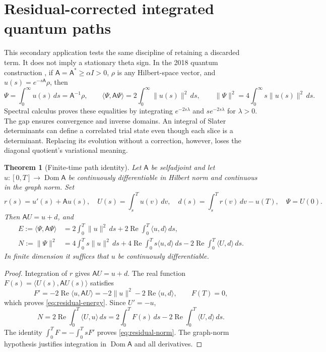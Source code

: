 \documentclass[11pt]{article}
\numberwithin{equation}{section}
\newtheorem{theorem}{Theorem}[section]
\theoremstyle{definition}
\theoremstyle{remark}
\begin{document}
\section{Residual-corrected integrated quantum paths}
\label{sec:quantum-paths}
This secondary application tests the same discipline of retaining a
discarded term.  It does not imply a stationary theta sign.  In the
2018 quantum construction \cite{baker2018heat}, if
$\mathsf A=\mathsf A^*\ge\alpha I>0$, $\rho$ is any Hilbert-space
vector, and $u(s)=e^{-s\mathsf A}\rho$, then
\begin{equation}\label{eq:infinite-quantum-identities}
 \Psi=\int_0^\infty u(s)\,ds=\mathsf A^{-1}\rho,\qquad
 \langle\Psi,\mathsf A\Psi\rangle
 =2\int_0^\infty\|u(s)\|^2\,ds,\qquad
 \|\Psi\|^2=4\int_0^\infty s\|u(s)\|^2\,ds.
\end{equation}
Spectral calculus proves these equalities by integrating
$e^{-2s\lambda}$ and $s e^{-2s\lambda}$ for $\lambda>0$.
The gap ensures convergence and inverse domains.  An integral of
Slater determinants can define a correlated trial state even though
each slice is a determinant.  Replacing its evolution without a
correction, however, loses the diagonal quotient's variational meaning.

\begin{theorem}[Finite-time path identity]\label{thm:residual-path}
Let $\mathsf A$ be selfadjoint and let $u:[0,T]\to\operatorname{Dom}
\mathsf A$ be continuously differentiable in Hilbert norm and
continuous in the graph norm.  Set
\begin{equation}\label{eq:path-defects}
 r(s)=u'(s)+\mathsf A u(s),\quad
 U(s)=\int_s^T u(v)\,dv,\quad
 d(s)=\int_s^T r(v)\,dv-u(T),\quad \Psi=U(0).
\end{equation}
Then $\mathsf A U=u+d$, and
\begin{align}
 E:=\langle\Psi,\mathsf A\Psi\rangle
 &=2\int_0^T\|u\|^2\,ds
   +2\operatorname{Re}\int_0^T\langle u,d\rangle\,ds,
   \label{eq:residual-energy}\\
 N:=\|\Psi\|^2
 &=4\int_0^T s\|u\|^2\,ds
   +4\operatorname{Re}\int_0^T s\langle u,d\rangle\,ds
   -2\operatorname{Re}\int_0^T\langle U,d\rangle\,ds.
   \label{eq:residual-norm}
\end{align}
In finite dimension it suffices that $u$ be continuously differentiable.
\end{theorem}
\begin{proof}
Integration of $r$ gives $\mathsf A U=u+d$.  The real function
$F(s)=\langle U(s),\mathsf A U(s)\rangle$ satisfies
\[
 F'=-2\operatorname{Re}\langle u,\mathsf A U\rangle
    =-2\|u\|^2-2\operatorname{Re}\langle u,d\rangle,
 \qquad F(T)=0,
\]
which proves \eqref{eq:residual-energy}.  Since $U'=-u$,
\[
 N=2\operatorname{Re}\int_0^T\langle U,u\rangle\,ds
  =2\int_0^T F(s)\,ds
   -2\operatorname{Re}\int_0^T\langle U,d\rangle\,ds.
\]
The identity $\int_0^TF=-\int_0^TsF'$ proves
\eqref{eq:residual-norm}.  The graph-norm hypothesis justifies
integration in $\operatorname{Dom}\mathsf A$ and all derivatives.
\end{proof}
\end{document}
